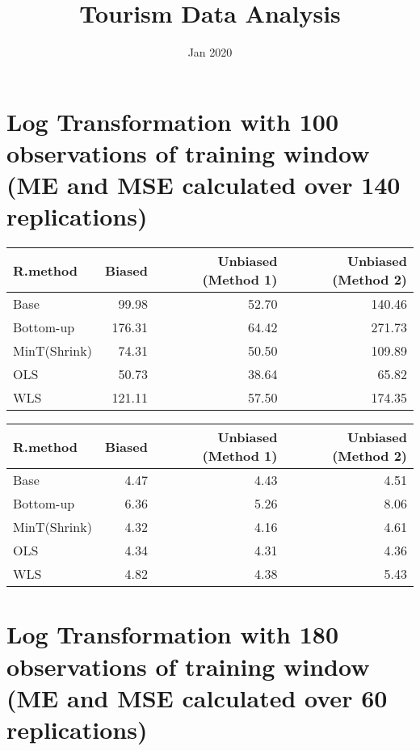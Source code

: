 \documentclass[
]{article}
\title{Tourism Data Analysis}
\author{}
\date{\vspace{-2.5em}Jan 2020}
\begin{document}
\maketitle

\hypertarget{log-transformation-with-100-observations-of-training-window-me-and-mse-calculated-over-140-replications}{%
\section{Log Transformation with 100 observations of training window (ME
and MSE calculated over 140
replications)}\label{log-transformation-with-100-observations-of-training-window-me-and-mse-calculated-over-140-replications}}

\begin{tabular}{l|r|r|r}
\hline
R.method & Biased & Unbiased (Method 1) & Unbiased (Method 2)\\
\hline
Base & 99.98 & 52.70 & 140.46\\
\hline
Bottom-up & 176.31 & 64.42 & 271.73\\
\hline
MinT(Shrink) & 74.31 & 50.50 & 109.89\\
\hline
OLS & 50.73 & 38.64 & 65.82\\
\hline
WLS & 121.11 & 57.50 & 174.35\\
\hline
\end{tabular}

\begin{tabular}{l|r|r|r}
\hline
R.method & Biased & Unbiased (Method 1) & Unbiased (Method 2)\\
\hline
Base & 4.47 & 4.43 & 4.51\\
\hline
Bottom-up & 6.36 & 5.26 & 8.06\\
\hline
MinT(Shrink) & 4.32 & 4.16 & 4.61\\
\hline
OLS & 4.34 & 4.31 & 4.36\\
\hline
WLS & 4.82 & 4.38 & 5.43\\
\hline
\end{tabular}

\hypertarget{log-transformation-with-180-observations-of-training-window-me-and-mse-calculated-over-60-replications}{%
\section{Log Transformation with 180 observations of training window (ME
and MSE calculated over 60
replications)}\label{log-transformation-with-180-observations-of-training-window-me-and-mse-calculated-over-60-replications}}
\end{document}
